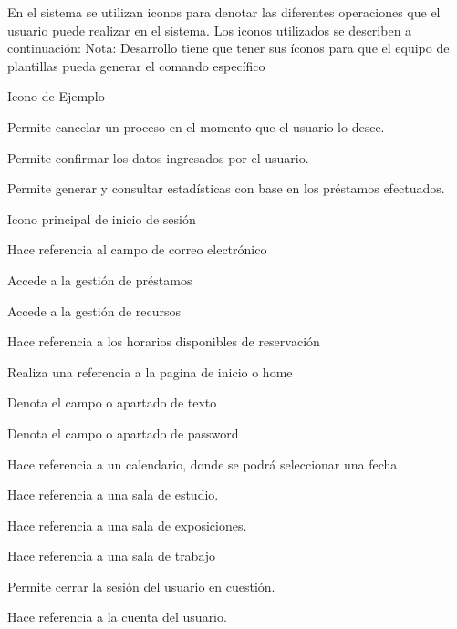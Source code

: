 En el sistema se utilizan iconos para denotar las diferentes operaciones que el usuario puede realizar
en el sistema. Los iconos utilizados se describen a continuación:
Nota: Desarrollo tiene que tener sus íconos para que el equipo de plantillas pueda generar el comando específico
\begin{Iconography}
	\item \ICexample Icono de Ejemplo
	\item \ICCancel  Permite cancelar un proceso en el momento que el usuario lo desee.
	\item \ICConfirm Permite confirmar los datos ingresados por el usuario.
	\item \ICQuery	 Permite generar y consultar estadísticas con base en los préstamos efectuados.
	\item \ICUnlockA Icono principal de inicio de sesión
	\item \ICEmail	Hace referencia al campo de correo electrónico
	\item \ICManageLoan  Accede a la gestión de préstamos
	\item \ICManageResource Accede a la gestión de recursos
	\item \ICTime	Hace referencia a los horarios disponibles de reservación
	\item \ICHome	Realiza una referencia a la pagina de inicio o home
    \item \ICName	Denota el campo o apartado de texto
	\item \ICPassword	Denota el campo o apartado de password
	\item \ICBooking Hace referencia a un calendario, donde se podrá seleccionar una fecha
	\item \ICStudyRoom  Hace referencia a una sala de estudio.
	\item \ICExpRoom  Hace referencia a una sala de exposiciones.
	\item \ICWorkRoom Hace referencia a una sala de trabajo
	\item \ICLogOut	Permite cerrar la sesión del usuario en cuestión.
	\item \ICUser   Hace referencia a la cuenta del usuario.
\end{Iconography}